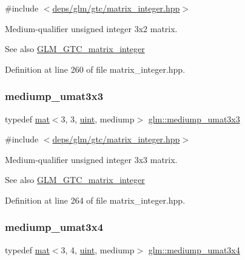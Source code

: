 {\ttfamily \#include $<$\hyperlink{matrix__integer_8hpp}{deps/glm/gtc/matrix\+\_\+integer.\+hpp}$>$}

Medium-\/qualifier unsigned integer 3x2 matrix. \begin{DoxySeeAlso}{See also}
\hyperlink{group__gtc__matrix__integer}{G\+L\+M\+\_\+\+G\+T\+C\+\_\+matrix\+\_\+integer} 
\end{DoxySeeAlso}


Definition at line 260 of file matrix\+\_\+integer.\+hpp.

\mbox{\label{group__gtc__matrix__integer_gac2563a9d45e3f6be0ceaf62b50a983f5}} 
\subsubsection{\texorpdfstring{mediump\+\_\+umat3x3}{mediump\_umat3x3}}
{\footnotesize\ttfamily typedef \hyperlink{structglm_1_1mat}{mat}$<$3, 3, \hyperlink{group__core__precision_ga4fd29415871152bfb5abd588334147c8}{uint}, mediump$>$ \hyperlink{group__gtc__matrix__integer_gac2563a9d45e3f6be0ceaf62b50a983f5}{glm\+::mediump\+\_\+umat3x3}}



{\ttfamily \#include $<$\hyperlink{matrix__integer_8hpp}{deps/glm/gtc/matrix\+\_\+integer.\+hpp}$>$}

Medium-\/qualifier unsigned integer 3x3 matrix. \begin{DoxySeeAlso}{See also}
\hyperlink{group__gtc__matrix__integer}{G\+L\+M\+\_\+\+G\+T\+C\+\_\+matrix\+\_\+integer} 
\end{DoxySeeAlso}


Definition at line 264 of file matrix\+\_\+integer.\+hpp.

\mbox{\label{group__gtc__matrix__integer_ga22e32b4dcd60655044ebbd30f50a2e67}} 
\subsubsection{\texorpdfstring{mediump\+\_\+umat3x4}{mediump\_umat3x4}}
{\footnotesize\ttfamily typedef \hyperlink{structglm_1_1mat}{mat}$<$3, 4, \hyperlink{group__core__precision_ga4fd29415871152bfb5abd588334147c8}{uint}, mediump$>$ \hyperlink{group__gtc__matrix__integer_ga22e32b4dcd60655044ebbd30f50a2e67}{glm\+::mediump\+\_\+umat3x4}}



